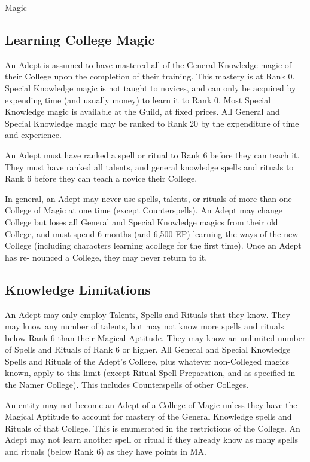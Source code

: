 \begin{Chapter}{Magic}
\subsection{Learning College Magic}

An Adept is assumed to have mastered all of the General Knowledge
magic of their College upon the completion of their training. This
mastery is at Rank 0. Special Knowledge magic is not taught to
novices, and can only be acquired by expending time (and usually
money) to learn it to Rank 0.  Most Special Knowledge magic is
available at the Guild, at fixed prices.  All General and Special
Knowledge magic may be ranked to Rank 20 by the expenditure of time
and experience.

An Adept must have ranked a spell or ritual to Rank 6 before they can
teach it.  They must have ranked all talents, and general knowledge
spells and rituals to Rank 6 before they can teach a novice their
College.

In general, an Adept may never use spells, talents, or rituals of more
than one College of Magic at one time (except Counterspells). An Adept
may change College but loses all General and Special Knowledge magics
from their old College, and must spend 6 months (and 6,500 EP)
learning the ways of the new College (including characters learning
acollege for the first time).  Once an Adept has re- nounced a
College, they may never return to it.

\subsection{Knowledge Limitations}

An Adept may only employ Talents, Spells and Rituals that they
know. They may know any number of talents, but may not know more
spells and rituals below Rank 6 than their Magical Aptitude.  They may
know an unlimited number of Spells and Rituals of Rank 6 or
higher. All General and Special Knowledge Spells and Rituals of the
Adept’s College, plus whatever non-Colleged magics known, apply to
this limit (except Ritual Spell Preparation, and as specified in the
Namer College).  This includes Counterspells of other Colleges.

An entity may not become an Adept of a College of Magic unless they
have the Magical Aptitude to account for mastery of the General
Knowledge spells and Rituals of that College.  This is enumerated in
the restrictions of the College.  An Adept may not learn another spell
or ritual if they already know as many spells and rituals (below Rank
6) as they have points in MA.


\end{Chapter}
